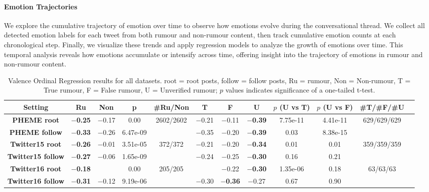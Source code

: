 \paragraph{Emotion Trajectories} 
We explore the cumulative trajectory of emotion over time to observe how emotions evolve during the conversational thread. We collect all detected emotion labels for each tweet from both rumour and non-rumour content, then track cumulative emotion counts at each chronological step. Finally, we visualize these trends and apply regression models to analyze the growth of emotions over time. This temporal analysis reveals how emotions accumulate or intensify across time, offering insight into the trajectory of emotions in rumour and non-rumour content.

\begin{table*}[!h]
    \centering
    \small
    \begin{tabular}{cccccccccccc}
        \toprule
        \textbf{Setting} & \textbf{Ru} & \textbf{Non} & \textbf{p} & \textbf{\#Ru/Non} & \textbf{T} & \textbf{F} & \textbf{U} & \textbf{$p$ (U vs T)} & \textbf{$p$ (U vs F)} & \textbf{\#T/\#F/\#U} \\
        \midrule
        \textbf{PHEME root} & \textbf{$-$0.25} & $-$0.17 & 0.00 & 2602/2602 & $-$0.21 & $-$0.11 & \textbf{$-$0.39} & 7.75e-11 & 4.41e-11 & 629/629/629 \\
        \textbf{PHEME follow} & \textbf{$-$0.33} & $-$0.26 & 6.47e-09 & & $-$0.35 & $-$0.20 & \textbf{$-$0.39} & 0.03 & 8.38e-15 & \\
        \textbf{Twitter15 root} & \textbf{$-$0.26} & $-$0.01 & 3.51e-05 & 372/372 & $-$0.21 & $-$0.20 & \textbf{$-$0.34} & 0.01 & 0.01 & 359/359/359 \\
        \textbf{Twitter15 follow} & \textbf{$-$0.27} & $-$0.06 & 1.65e-09 & & $-$0.24 & $-$0.25 & \textbf{$-$0.30} & 0.16 & 0.21 & \\
        \textbf{Twitter16 root} & \textbf{$-$0.18} & \z0.07 & 0.00 & 205/205 & \z0.11 & $-$0.22 & \textbf{$-$0.30} & 1.35e-06 & 0.18 & 63/63/63 \\
        \textbf{Twitter16 follow} & \textbf{$-$0.31} & $-$0.12 & 9.19e-06 & & $-$0.30 & \textbf{$-$0.36} & $-$0.27 & 0.67 & 0.90 & \\
        \bottomrule
    \end{tabular}
    \caption{Valence Ordinal Regression results for all datasets. root = root posts, follow = follow posts, Ru = rumour, Non = Non-rumour, T = True rumour, F = False rumour, U = Unverified rumour; $p$ values indicates significance of a one-tailed t-test.}
\label{tab:voc_results}
\end{table*}

